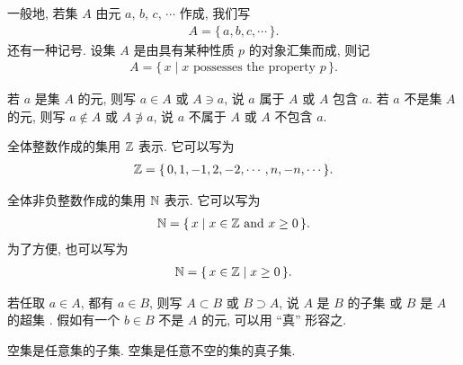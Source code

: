 \begin{definition}
    一般地, 若集 $A$ 由元 $a$, $b$, $c$, $\cdots$ 作成, 我们写
    \begin{align*}
        A = \{\, a,b,c,\cdots \,\}.
    \end{align*}
    还有一种记号. 设集 $A$ 是由具有某种性质 $p$ 的对象汇集而成, 则记
    \begin{align*}
        A = \{\, x \mid x \text{ possesses the property } p \,\}.
    \end{align*}
\end{definition}

\begin{definition}
    若 $a$ 是集 $A$ 的元, 则写 $a \in A$ 或 $A \ni a$, 说 $a$ 属于  $A$ 或 $A$ 包含  $a$. 若 $a$ 不是集 $A$ 的元, 则写 $a \notin A$ 或 $A \not\ni a$, 说 $a$ 不属于 $A$ 或 $A$ 不包含 $a$.
\end{definition}

\begin{example}
    全体整数作成的集用 $\mathbb{Z}$  表示. 它可以写为
    \begin{align*}
        \mathbb{Z} = \{\, 0,1,-1,2,-2,\cdots,n,-n,\cdots \,\}.
    \end{align*}
\end{example}

\begin{example}
    全体非负整数作成的集用 $\mathbb{N}$  表示. 它可以写为
    \begin{align*}
        \mathbb{N} = \{\, x \mid x \in \mathbb{Z} \text{ and } x \geq 0 \,\}.
    \end{align*}
    为了方便, 也可以写为
    \begin{align*}
        \mathbb{N} = \{\, x \in \mathbb{Z} \mid x \geq 0 \,\}.
    \end{align*}
\end{example}

\begin{definition}
    若任取 $a \in A$, 都有 $a \in B$, 则写 $A \subset B$ 或 $B \supset A$, 说 $A$ 是 $B$ 的子集  或 $B$ 是 $A$ 的超集 . 假如有一个 $b \in B$ 不是 $A$ 的元, 可以用 ``真''  形容之.
\end{definition}

\begin{example}
    空集是任意集的子集. 空集是任意不空的集的真子集.
\end{example}

